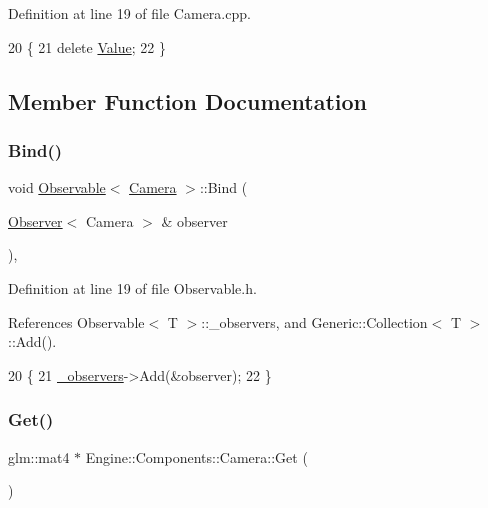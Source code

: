 Definition at line 19 of file Camera.\+cpp.


\begin{DoxyCode}
20 \{
21     \textcolor{keyword}{delete} \mbox{\hyperlink{classEngine_1_1Components_1_1Camera_a5d131a78545d9f70496549946503b27a}{Value}};
22 \}
\end{DoxyCode}


\subsection{Member Function Documentation}
\mbox{\label{classObservable_aedd54eccbfad67066226ee0b958347ba}} 
\subsubsection{\texorpdfstring{Bind()}{Bind()}}
{\footnotesize\ttfamily void \mbox{\hyperlink{classObservable}{Observable}}$<$ \mbox{\hyperlink{classEngine_1_1Components_1_1Camera}{Camera}}  $>$\+::Bind (\begin{DoxyParamCaption}\item[{\mbox{\hyperlink{classObserver}{Observer}}$<$ Camera  $>$ \&}]{observer }\end{DoxyParamCaption})\hspace{0.3cm}{\ttfamily [inline]}, {\ttfamily [inherited]}}



Definition at line 19 of file Observable.\+h.



References Observable$<$ T $>$\+::\+\_\+observers, and Generic\+::\+Collection$<$ T $>$\+::\+Add().


\begin{DoxyCode}
20     \{
21         \mbox{\hyperlink{classObservable_ae6028589035c86e8a9c4375306dca702}{\_observers}}->Add(&observer);
22     \}
\end{DoxyCode}
\mbox{\label{classEngine_1_1Components_1_1Camera_ad24b41321813d1757cb6dd0db52e34dd}} 
\subsubsection{\texorpdfstring{Get()}{Get()}}
{\footnotesize\ttfamily glm\+::mat4 $\ast$ Engine\+::\+Components\+::\+Camera\+::\+Get (\begin{DoxyParamCaption}{ }\end{DoxyParamCaption})}



